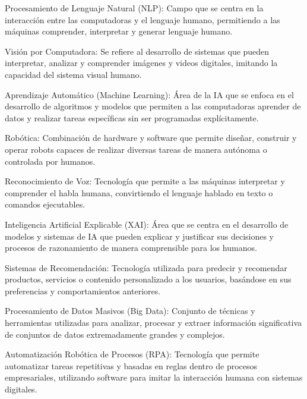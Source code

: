\begin{myitemize}
    \item Procesamiento de Lenguaje Natural (NLP): Campo que se centra en la interacción 
    entre las computadoras y el lenguaje humano, permitiendo a las máquinas comprender, 
    interpretar y generar lenguaje humano.
    
    \item Visión por Computadora: Se refiere al desarrollo de sistemas que pueden 
    interpretar, analizar y comprender imágenes y videos digitales, imitando la 
    capacidad del sistema visual humano.

    \item Aprendizaje Automático (Machine Learning): Área de la IA que se enfoca 
    en el desarrollo de algoritmos y modelos que permiten a las computadoras 
    aprender de datos y realizar tareas específicas sin ser programadas explícitamente.
    
    \item Robótica: Combinación de hardware y software que permite diseñar, 
    construir y operar robots capaces de realizar diversas tareas de manera autónoma 
    o controlada por humanos.
    
    \item Reconocimiento de Voz: Tecnología que permite a las máquinas interpretar 
    y comprender el habla humana, convirtiendo el lenguaje hablado en texto o 
    comandos ejecutables.
    
    \item Inteligencia Artificial Explicable (XAI): Área que se centra en el 
    desarrollo de modelos y sistemas de IA que pueden explicar y justificar sus 
    decisiones y procesos de razonamiento de manera comprensible para los humanos.
    
    \item Sistemas de Recomendación: Tecnología utilizada para predecir y recomendar 
    productos, servicios o contenido personalizado a los usuarios, basándose en 
    sus preferencias y comportamientos anteriores.
    
    \item Procesamiento de Datos Masivos (Big Data): Conjunto de técnicas y 
    herramientas utilizadas para analizar, procesar y extraer información 
    significativa de conjuntos de datos extremadamente grandes y complejos.
    
    \item Automatización Robótica de Procesos (RPA): Tecnología que permite 
    automatizar tareas repetitivas y basadas en reglas dentro de procesos 
    empresariales, utilizando software para imitar la interacción humana 
    con sistemas digitales.
    

\end{myitemize}
